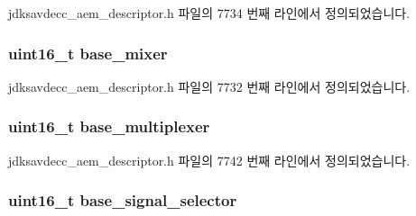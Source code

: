 jdksavdecc\+\_\+aem\+\_\+descriptor.\+h 파일의 7734 번째 라인에서 정의되었습니다.

\subsubsection[{\texorpdfstring{base\+\_\+mixer}{base_mixer}}]{\setlength{\rightskip}{0pt plus 5cm}uint16\+\_\+t base\+\_\+mixer}\hypertarget{structjdksavdecc__descriptor__audio__unit_ad2cbeba461f7e25ffee9118ab1343ee0}{}\label{structjdksavdecc__descriptor__audio__unit_ad2cbeba461f7e25ffee9118ab1343ee0}


jdksavdecc\+\_\+aem\+\_\+descriptor.\+h 파일의 7732 번째 라인에서 정의되었습니다.

\subsubsection[{\texorpdfstring{base\+\_\+multiplexer}{base_multiplexer}}]{\setlength{\rightskip}{0pt plus 5cm}uint16\+\_\+t base\+\_\+multiplexer}\hypertarget{structjdksavdecc__descriptor__audio__unit_a3e13f295f26afe3335587c18790c7dda}{}\label{structjdksavdecc__descriptor__audio__unit_a3e13f295f26afe3335587c18790c7dda}


jdksavdecc\+\_\+aem\+\_\+descriptor.\+h 파일의 7742 번째 라인에서 정의되었습니다.

\subsubsection[{\texorpdfstring{base\+\_\+signal\+\_\+selector}{base_signal_selector}}]{\setlength{\rightskip}{0pt plus 5cm}uint16\+\_\+t base\+\_\+signal\+\_\+selector}\hypertarget{structjdksavdecc__descriptor__audio__unit_a5bd998af8a76ae1336006ec16829b64d}{}\label{structjdksavdecc__descriptor__audio__unit_a5bd998af8a76ae1336006ec16829b64d}


